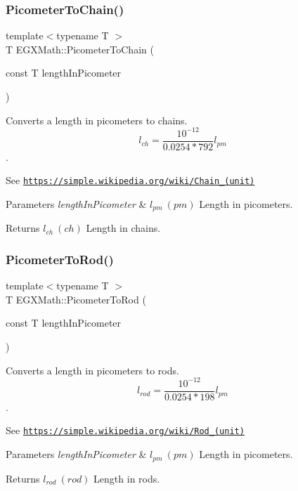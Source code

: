 \subsubsection{\texorpdfstring{Picometer\+To\+Chain()}{PicometerToChain()}}
{\footnotesize\ttfamily template$<$typename T $>$ \\
T E\+G\+X\+Math\+::\+Picometer\+To\+Chain (\begin{DoxyParamCaption}\item[{const T}]{length\+In\+Picometer }\end{DoxyParamCaption})}



Converts a length in picometers to chains. \[ l_{ch}= \frac{10^{-12}}{0.0254 * 792} l_{pm} \]. 

See \href{https://simple.wikipedia.org/wiki/Chain_(unit)}{\tt https\+://simple.\+wikipedia.\+org/wiki/\+Chain\+\_\+(unit)} 
\begin{DoxyParams}{Parameters}
{\em length\+In\+Picometer} & $ l_{pm}\ (pm)$ Length in picometers. \\
\hline
\end{DoxyParams}
\begin{DoxyReturn}{Returns}
$ l_{ch}\ (ch)$ Length in chains. 
\end{DoxyReturn}
\mbox{\label{group___e_g_x_math-_conversions-_length_conversions-_picometer-_surveyors_gad6009949eef7a49d34a7fa859ecdf0c6}} 
\subsubsection{\texorpdfstring{Picometer\+To\+Rod()}{PicometerToRod()}}
{\footnotesize\ttfamily template$<$typename T $>$ \\
T E\+G\+X\+Math\+::\+Picometer\+To\+Rod (\begin{DoxyParamCaption}\item[{const T}]{length\+In\+Picometer }\end{DoxyParamCaption})}



Converts a length in picometers to rods. \[ l_{rod}= \frac{10^{-12}}{0.0254 * 198} l_{pm} \]. 

See \href{https://simple.wikipedia.org/wiki/Rod_(unit)}{\tt https\+://simple.\+wikipedia.\+org/wiki/\+Rod\+\_\+(unit)} 
\begin{DoxyParams}{Parameters}
{\em length\+In\+Picometer} & $ l_{pm}\ (pm)$ Length in picometers. \\
\hline
\end{DoxyParams}
\begin{DoxyReturn}{Returns}
$ l_{rod}\ (rod)$ Length in rods. 
\end{DoxyReturn}
